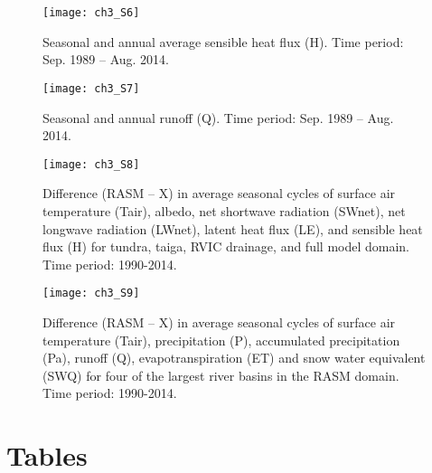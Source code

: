\begin{figure}
    \centering
    \texttt{[image: ch3\_S6]}
    \caption{Seasonal and annual average sensible heat flux (H).
    Time period: Sep. 1989 – Aug. 2014.}
\end{figure}

\begin{figure}
    \centering
    \texttt{[image: ch3\_S7]}
    \caption{Seasonal and annual runoff (Q).
    Time period: Sep. 1989 – Aug. 2014.}
\end{figure}

\begin{figure}
    \centering
    \texttt{[image: ch3\_S8]}
    \caption{Difference (RASM – X) in average seasonal cycles of surface air temperature (Tair), albedo, net shortwave radiation (SWnet), net longwave radiation (LWnet), latent heat flux (LE), and sensible heat flux (H) for tundra, taiga, RVIC drainage, and full model domain.
    Time period: 1990-2014.}
\end{figure}

\begin{figure}
    \centering
    \texttt{[image: ch3\_S9]}
    \caption{Difference (RASM – X) in average seasonal cycles of surface air temperature (Tair), precipitation (P), accumulated precipitation (Pa), runoff (Q), evapotranspiration (ET) and snow water equivalent (SWQ) for four of the largest river basins in the RASM domain.
    Time period: 1990-2014.}
\end{figure}

\clearpage
\section{Tables}

